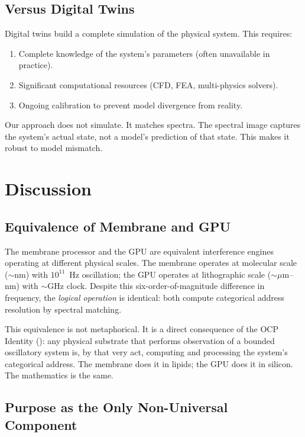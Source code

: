 \documentclass[11pt,twocolumn,a4paper]{article}
\theoremstyle{definition}
\theoremstyle{remark}
\begin{document}
\subsection{Versus Digital Twins}

Digital twins build a complete simulation of the physical system.  This requires:
\begin{enumerate}
    \item Complete knowledge of the system's parameters (often unavailable in practice).
    \item Significant computational resources (CFD, FEA, multi-physics solvers).
    \item Ongoing calibration to prevent model divergence from reality.
\end{enumerate}
Our approach does not simulate.  It matches spectra.  The spectral image captures the system's actual state, not a model's prediction of that state.  This makes it robust to model mismatch.


\section{Discussion}\label{sec:discussion}

\subsection{Equivalence of Membrane and GPU}

The membrane processor and the GPU are equivalent interference engines operating at different physical scales.  The membrane operates at molecular scale ($\sim$nm) with $10^{11}$~Hz oscillation; the GPU operates at lithographic scale ($\sim \mu$m--nm) with $\sim$GHz clock.  Despite this six-order-of-magnitude difference in frequency, the \emph{logical operation} is identical: both compute categorical address resolution by spectral matching.

This equivalence is not metaphorical.  It is a direct consequence of the OCP Identity (): any physical substrate that performs observation of a bounded oscillatory system is, by that very act, computing and processing the system's categorical address.  The membrane does it in lipids; the GPU does it in silicon.  The mathematics is the same.

\subsection{Purpose as the Only Non-Universal Component}
\end{document}
